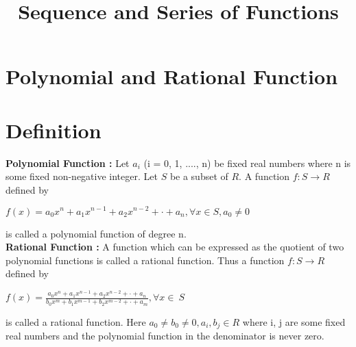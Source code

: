 \documentclass[12pt,a4paper]{article}
\title{\textbf{\textbf{Sequence and Series of Functions}}}
\author{}
\date{}
\begin{document}
\maketitle

\section*{Polynomial and Rational Function}
\section{Definition}
\textbf{Polynomial Function :}
Let $a_i$ (i = 0, 1, ...., n) be fixed real numbers where n is some fixed non-negative integer. Let $S$ be
a subset of $R$. A function $f: S \to R$ defined by
\begin{center}
$f(x) = a_0x^n + a_1x^{n-1} + a_2x^{n-2} + \cdot + a_n , \forall x \in S , a_0 \neq 0$
\end{center}
is called a polynomial function of degree n.\\
\textbf{Rational Function :}
A function which can be expressed as the quotient of two polynomial functions is called a
rational function.
Thus a function $f: S \to R$ defined by \\
\begin{center}
	$f(x)=\frac{a_0x^n + a_1x^{n-1} + a_2x^{n-2} + \cdot + a_n}{b_0x^m + b_1x^{m-1} + b_2x^{m-2} + \cdot + a_m} , \forall x \in\ S$\\
\end{center}

is called a rational function.
Here $a_0 \neq  b_0 \neq 0, a_i, b_j \in R $ where i, j are some fixed real numbers and the polynomial function in
the denominator is never zero.
\end{document}
